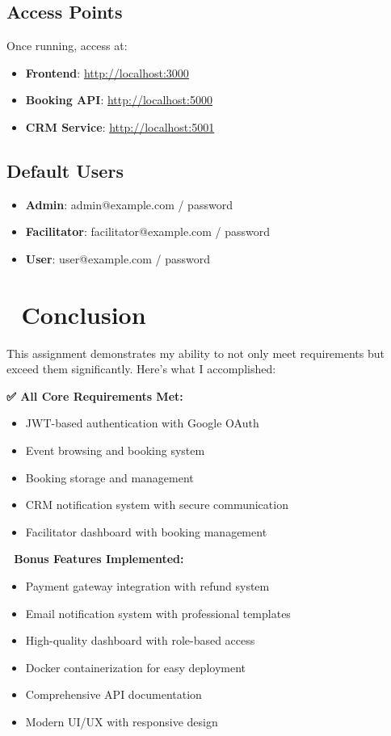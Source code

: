 \documentclass[12pt,a4paper]{article}
\begin{document}
\subsection{Access Points}
Once running, access at:
\begin{itemize}
    \item \textbf{Frontend}: \href{http://localhost:3000}{http://localhost:3000}
    \item \textbf{Booking API}: \href{http://localhost:5000}{http://localhost:5000}
    \item \textbf{CRM Service}: \href{http://localhost:5001}{http://localhost:5001}
\end{itemize}

\subsection{Default Users}
\begin{itemize}
    \item \textbf{Admin}: admin@example.com / password
    \item \textbf{Facilitator}: facilitator@example.com / password
    \item \textbf{User}: user@example.com / password
\end{itemize}

\section{🎯 Conclusion}

This assignment demonstrates my ability to not only meet requirements but exceed them significantly. Here's what I accomplished:

\textbf{✅ All Core Requirements Met:}
\begin{itemize}
    \item JWT-based authentication with Google OAuth
    \item Event browsing and booking system
    \item Booking storage and management
    \item CRM notification system with secure communication
    \item Facilitator dashboard with booking management
\end{itemize}

\textbf{🚀 Bonus Features Implemented:}
\begin{itemize}
    \item Payment gateway integration with refund system
    \item Email notification system with professional templates
    \item High-quality dashboard with role-based access
    \item Docker containerization for easy deployment
    \item Comprehensive API documentation
    \item Modern UI/UX with responsive design
\end{itemize}
\end{document}

